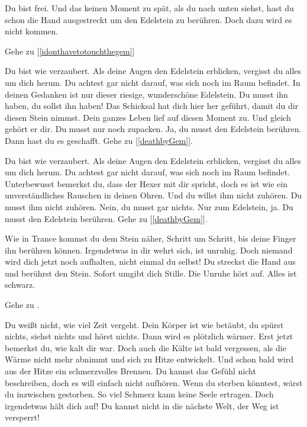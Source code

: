 Du bist frei. Und das keinen Moment zu spät, als du nach unten siehst, hast du schon die Hand ausgestreckt um den Edelstein zu berühren. Doch dazu wird es nicht kommen.

Gehe zu [\ref{idonthavetotouchthegem}]


Du bist wie verzaubert. Als deine Augen den Edelstein erblicken, vergisst du alles um dich herum. Du achtest gar nicht darauf, was sich noch im Raum befindet.
In deinen Gedanken ist nur dieser riesige, wunderschöne Edelstein.
Du musst ihn haben, du sollst ihn haben! Das Schicksal hat dich hier her geführt, damit du dir diesen Stein nimmst. Dein ganzes Leben lief auf diesen Moment zu. Und gleich gehört er dir. Du musst nur noch zupacken. Ja, du musst den Edelstein berühren. Dann hast du es geschafft. Gehe zu [\ref{deathbyGem}].


Du bist wie verzaubert. Als deine Augen den Edelstein erblicken, vergisst du alles um dich herum. Du achtest gar nicht darauf, was sich noch im Raum befindet. Unterbewusst bemerkst du, dass der Hexer mit dir spricht, doch es ist wie ein unverständliches Rauschen in deinen Ohren. Und du willst ihm nicht zuhören. Du musst ihm nicht zuhören. Nein, du musst gar nichts. Nur zum Edelstein, ja. Du musst den Edelstein berühren. Gehe zu [\ref{deathbyGem}].


Wie in Trance kommst du dem Stein näher, Schritt um Schritt, bis deine Finger ihn berühren können. Irgendetwas in dir wehrt sich, ist unruhig. Doch niemand wird dich jetzt noch aufhalten, nicht einmal du selbst! Du streckst die Hand aus und berührst den Stein. Sofort umgibt dich Stille. Die Unruhe hört auf. Alles ist schwarz.

Gehe zu .


Du weißt nicht, wie viel Zeit vergeht. Dein Körper ist wie betäubt, du spürst nichts, siehst nichts und hörst nichts. Dann wird es plötzlich wärmer. Erst jetzt bemerkst du, wie kalt dir war. Doch auch die Kälte ist bald vergessen, als die Wärme nicht mehr abnimmt und sich zu Hitze entwickelt. Und schon bald wird aus der Hitze ein schmerzvolles Brennen. Du kannst das Gefühl nicht beschreiben, doch es will einfach nicht aufhören. Wenn du sterben könntest, wärst du inzwischen gestorben. So viel Schmerz kann keine Seele ertragen. Doch irgendetwas hält dich auf! Du kannst nicht in die nächste Welt, der Weg ist versperrt!

